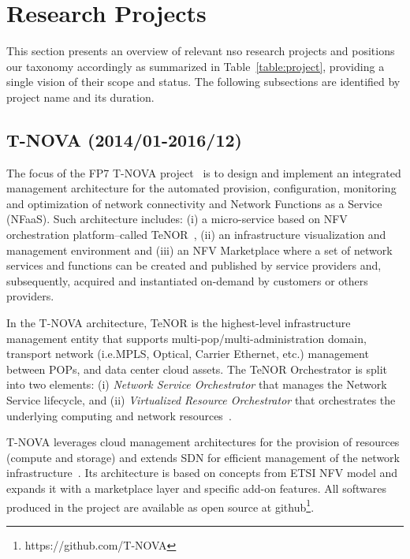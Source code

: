 \section{Research Projects}
\label{sec:project}
 
This section presents an overview of relevant \gls{nso} research projects and positions our taxonomy accordingly as summarized in Table~\ref{table:project}, providing a single vision of their scope and status. 
The following subsections are identified by project name and its duration.

\subsection{T-NOVA (2014/01-2016/12)}

The focus of the FP7 T-NOVA project~\cite{FP7projectT-NOVAT-NOVAInfrastructures} is to design and implement an integrated management architecture for the automated provision, configuration, monitoring and optimization of network connectivity and Network Functions as a Service (NFaaS). Such architecture includes: (i) a micro-service based on NFV orchestration platform--called TeNOR~\cite{7502419}, (ii) an infrastructure visualization and management environment and (iii) an NFV Marketplace where a set of network services and functions can be created and published by service providers and, subsequently, acquired and instantiated on-demand by customers
 or others providers.

In the T-NOVA architecture, TeNOR is the highest-level infrastructure management entity that supports multi-pop/multi-administration domain, transport network (i.e.MPLS, Optical, Carrier    Ethernet, etc.) management between POPs, and data center cloud assets. The TeNOR Orchestrator is split into two elements: (i) \textit{Network Service Orchestrator} that manages the Network Service lifecycle, and (ii) \textit{Virtualized Resource Orchestrator} that orchestrates the underlying computing and network resources~\cite{Kourtis2017T-NOVA:Infrastructures}. 

T-NOVA leverages cloud management architectures for the provision of resources (compute and storage) and extends SDN for efficient management of the network infrastructure~\cite{T-NOVAD2.1:Requirements}. Its architecture is based on concepts from ETSI NFV model and expands it with a marketplace layer and specific add-on features. All softwares produced in the project are available as open source at github\footnote{https://github.com/T-NOVA}.

